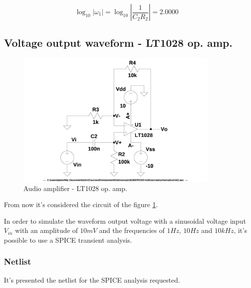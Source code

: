 \documentclass[10pt,a4paper]{article}
\begin{document}
\begin{equation} \label{eq:omega_1log}
\log_{10} |\omega_1| =
\log_{10} \left| \frac{1}{C_2R_2} \right|= 2.0000
\end{equation}

\subsection{Voltage output waveform - LT1028 op. amp.}
\begin{figure}[h]
  \centering
  \includegraphics[width=10cm]{schematics/1d2.jpg}
  \caption{Audio amplifier - LT1028 op. amp.}
  \label{1d2schematics}
\end{figure}

From now it's considered the circuit of the figure \ref{1d2schematics}.\par
\medskip
In order to simulate the waveform output voltage with a sinusoidal voltage input $V_{in}$ with an amplitude of $10mV$ and the frequencies of $1Hz$, $10Hz$ and $10kHz$, it's possible to use a SPICE transient analysis.\\

\subsubsection{Netlist}
It's presented the netlist for the SPICE analysis requested.

\end{document}
